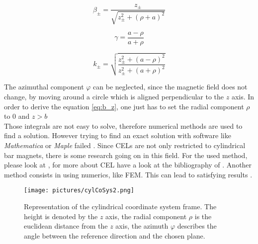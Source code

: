 \begin{equation}
\beta_{\pm} = \frac{z_{\pm}}{\sqrt{z_{\pm}^2+(\rho+a)^2}}
\end{equation}

\begin{equation}
\gamma = \frac{a-\rho}{a+\rho}
\end{equation}

\begin{equation}
k_{\pm} = \sqrt{\frac{z_{\pm}^2 + (a-\rho)^2}{z_{\pm}^2 + (a+\rho)^2}}
\end{equation}

The azimuthal component $ \varphi $ can be neglected, since the magnetic field does not change, by moving around a circle which is aligned perpendicular to the $ z $ axis. In order to derive the equation \ref{eq:b_z}, one just has to set the radial component $ \rho $ to 0 and $ z > b $\\
Those integrals are not easy to solve, therefore numerical methods are used to find a solution. However trying to find an exact solution with software like \textit{Mathematica} or \textit{Maple} failed \cite{camacho2013alternative}. Since \acp{CEL} are not only restricted to cylindrical bar magnets, there is some research going on in this field. For the used method, please look at , for more about \ac{CEL} have a look at the bibliography of \cite{derby2010cylindrical}. Another method consists in using numerics, like \ac{FEM}. This can lead to satisfying results \cite{mladenovic2009magnetic}.

\begin{figure}
\centering
\texttt{[image: pictures/cylCoSys2.png]}
\caption{Representation of the cylindrical coordinate system frame. The height is denoted by the $ z $ axis, the radial component $ \rho $ is the euclidean distance from the $ z $ axis, the azimuth $ \varphi $ describes the angle between the reference direction and the chosen plane. \cite{derby2010cylindrical}}
\label{fig:cylCoSys}
\end{figure}


